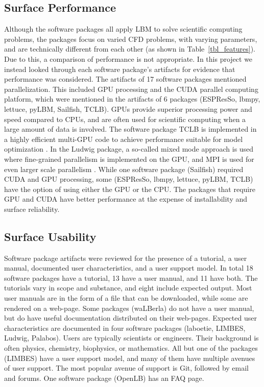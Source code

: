 \documentclass[final, 3p, times, authoryear]{elsarticle}
\begin{document}
\subsection{Surface Performance}

Although the software packages all apply LBM to solve scientific computing
problems, the packages focus on varied CFD problems, with varying parameters,
and are technically different from each other (as shown in
Table~\ref{tbl_features}). Due to this, a comparison of performance is not
appropriate. In this project we instead looked through each software package's
artifacts for evidence that performance was considered. The artifacts of 17
software packages mentioned parallelization. This included GPU processing and
the CUDA parallel computing platform, which were mentioned in the artifacts of 6
packages (ESPResSo, lbmpy, lettuce, pyLBM, Sailfish, TCLB). GPUs provide
superior processing power and speed compared to CPUs, and are often used for
scientific computing when a large amount of data is involved. The software
package TCLB is implemented in a highly efficient multi-GPU code to achieve
performance suitable for model optimization \citep{rutkowski2020open}. In the
Ludwig package, a so-called mixed mode approach is used where fine-grained
parallelism is implemented on the GPU, and MPI is used for even larger scale
parallelism \citep{gray2013ludwig}. While one software package (Sailfish)
required CUDA and GPU processing, some (ESPResSo, lbmpy, lettuce, pyLBM, TCLB)
have the option of using either the GPU or the CPU. The packages that require
GPU and CUDA have better performance at the expense of installability and
surface reliability.

\subsection{Surface Usability}

Software package artifacts were reviewed for the presence of a tutorial, a user
manual, documented user characteristics, and a user support model. In total 18
software packages have a tutorial, 13 have a user manual, and 11 have both. The
tutorials vary in scope and substance, and eight include expected output.
Most user manuals are in the form of a file that can be downloaded, while some
are rendered on a web-page. Some packages (waLBerla) do not have a user manual,
but do have useful documentation distributed on their web-pages. Expected user
characteristics are documented in four software packages (laboetie, LIMBES,
Ludwig, Palabos). Users are typically scientists or engineers. Their background
is often physics, chemistry, biophysics, or mathematics. All but one of the
packages (LIMBES) have a user support model, and many of them have multiple
avenues of user support. The most popular avenue of support is Git, followed by
email and forums. One software package (OpenLB) has an FAQ page.    
\end{document}
